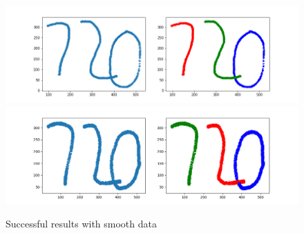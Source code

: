 \documentclass{article}
\begin{document}
\begin{figure}[htbp]
\centering
\includegraphics[width=0.8  \textwidth]{smooth_720_1.png}
\vspace{-2em}
\includegraphics[width=0.8 \textwidth]{smooth_720_2.png}
\vspace{1em}
\caption{Successful results with smooth data}
\label{smooth_720}
\end{figure}
\end{document}
